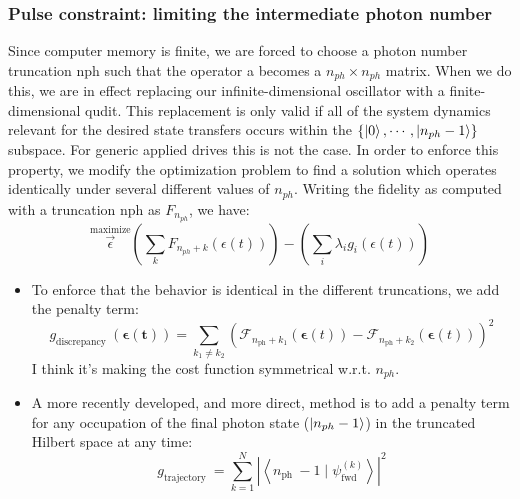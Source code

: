 \documentclass[12pt]{article}
\begin{document}
\subsubsection{Pulse constraint: limiting the intermediate photon number}
Since computer memory is finite, we are forced to choose a photon number truncation nph such that the operator a becomes a $n_{ph} \times n_{ph}$ matrix. 
When we do this, we are in effect replacing our infinite-dimensional oscillator with a finite-dimensional qudit. 
This replacement is only valid if all of the system dynamics relevant for the desired state transfers occurs within the $\{\ket{0} ,\cdots , \ket{n_{ph} - 1} \}$ subspace. 
For generic applied drives this is not the case. In order to enforce this property, we modify the optimization problem to find a solution which operates identically under several different values of $n_{ph}$.
Writing the fidelity as computed with a truncation nph as $F_{n_{ph}}$, we have:
\begin{equation}
    \stackrel{\text{maximize}}{\vec{\epsilon}} \left( \sum_k F_{n_{ph}+k} (\epsilon(t)) \right) - \left( \sum_i \lambda_i g_i (\epsilon(t)) \right)
\end{equation}

\begin{itemize}
    \item To enforce that the behavior is identical in the different truncations, we add the penalty term: 
        \begin{equation*}
            g_{\text {discrepancy }}(\boldsymbol{\epsilon}(\boldsymbol{t}))=\sum_{k_1 \neq k_2}\left(\mathcal{F}_{n_{\mathrm{ph}}+k_1}(\boldsymbol{\epsilon}(t))-\mathcal{F}_{n_{\mathrm{ph}}+k_2}(\boldsymbol{\epsilon}(t))\right)^2
        \end{equation*}
        I think it's making the cost function symmetrical w.r.t. $n_{ph}$.
    \item A more recently developed, and more direct, method is to add a penalty term for any occupation of the final photon state ($\ket{n_{ph} - 1}$) in the truncated Hilbert space at any time:
        \begin{equation*}
            g_{\text {trajectory }}=\sum_{k=1}^N\left|\left\langle n_{\text {ph }}-1 \mid \psi_{\text {fwd }}^{(k)}\right\rangle\right|^2
        \end{equation*}
\end{itemize}
\end{document}
